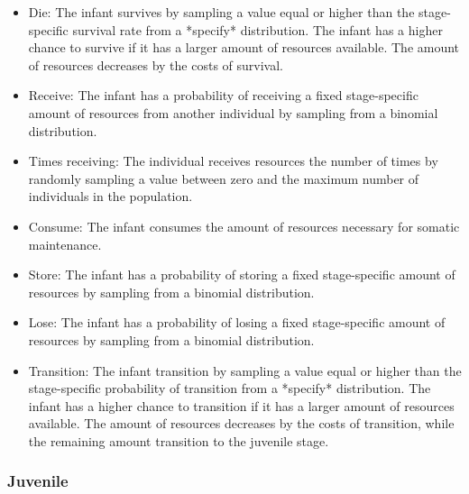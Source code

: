 \documentclass{article}
\begin{document}
\begin{itemize}
    \item Die: The infant survives by sampling a value equal or higher than the stage-specific survival rate from a *specify* distribution. The infant has a higher chance to survive if it has a larger amount of resources available. The amount of resources decreases by the costs of survival.
    \item Receive: The infant has a probability of receiving a fixed stage-specific amount of resources from another individual by sampling from a binomial distribution.
    \item Times receiving: The individual receives resources the number of times by randomly sampling a value between zero and the maximum number of individuals in the population.
    \item Consume: The infant consumes the amount of resources necessary for somatic maintenance.
    \item Store: The infant has a probability of storing a fixed stage-specific amount of resources by sampling from a binomial distribution.
    \item Lose: The infant has a probability of losing a fixed stage-specific amount of resources by sampling from a binomial distribution.
    \item Transition: The infant transition by sampling a value equal or higher than the stage-specific probability of transition from a *specify* distribution. The infant has a higher chance to transition if it has a larger amount of resources available. The amount of resources decreases by the costs of transition, while the remaining amount transition to the juvenile stage.
\end{itemize}

\subsubsection{Juvenile}
\end{document}
